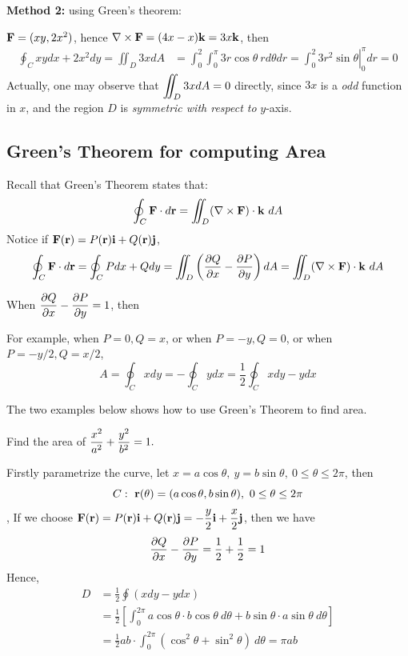 \begin{spacing}{1.3}
    \vspace{0.2in}
    {\bf Method 2: } using Green's theorem:

    ${\bf F}=(xy, 2x^2)$, hence $\nabla \times {\bf F}=(4x-x){\bf k} =3x{\bf k}$, then
    \begin{align*}
        \oint_{C} x y d x+2 x^{2} d y = \iint_D 3x dA &=\int_0^2\int_0^{\pi} 3r\cos\theta \ rd\theta dr 
            = \left. \int_0^2 3r^2\sin\theta \right|_0^{\pi} dr=0
    \end{align*}
    Actually, one may observe that $\displaystyle \iint_D 3x dA=0$ directly, since $3x$ is a {\it odd} function in 
    $x$, and the region $D$ is {\it symmetric with respect to }$y$-axis.



    \newpage
    \subsection{Green's Theorem for computing Area}

    Recall that Green's Theorem states that:
    $$\oint_C {\bf F}\cdot d{\bf r}=\iint_D (\nabla \times {\bf F})\cdot {\bf k}\ dA$$
    Notice if ${\bf F}({\bf r})=P({\bf r}){\bf i}+Q({\bf r}){\bf j}$,
    $$\oint_{C} \mathbf{F} \cdot d \mathbf{r}=\oint_{C} P d x+Q d y
    =\iint_{D}\left(\frac{\partial Q}{\partial x}-\frac{\partial P}{\partial y}\right) d A
    =\iint_D (\nabla \times {\bf F})\cdot {\bf k}\ dA$$

    When $\displaystyle \frac{\partial Q}{\partial x}-\frac{\partial P}{\partial y}=1$, then 
    \begin{center}
    \end{center}

    For example, when $P=0, Q=x$, or when $P=-y, Q=0$, or when $P=-y/2, Q=x/2$,
    $$A=\oint_C xdy=-\oint_C ydx=\frac{1}{2}\oint_C xdy-ydx$$



    \newpage
    {\blue The two examples below shows how to use Green's Theorem to find area.}

    \eg Find the area of $\displaystyle \frac{x^2}{a^2}+\frac{y^2}{b^2}=1.$

    \sol Firstly parametrize the curve, let $x=a\cos\theta,\ y=b\sin\theta,\ 0\le \theta\le 2\pi$, then 
    $$C:\ {\bf r}(\theta)=(a\cos\theta, b\sin\theta),\ 0\le \theta\le 2\pi$$,
    If we choose $\displaystyle {\bf F}({\bf r})=P({\bf r}){\bf i}+Q({\bf r}){\bf j}=-\frac{y}{2}{\bf i}+\frac{x}{2}{\bf j}$, then we have
    $$\frac{\partial Q}{\partial x}-\frac{\partial P}{\partial y}=\frac{1}{2}+\frac{1}{2}=1$$
    Hence, 
    \begin{align*}
        D &= \frac{1}{2} \oint (xdy-ydx)\\
        &= \frac{1}{2} \left[ \int_0^{2\pi} a\cos\theta\cdot b\cos\theta\ d\theta 
        + b\sin\theta\cdot a\sin\theta\ d\theta \right]\\
        &= \frac{1}{2} ab \cdot \int_0^{2\pi} (\cos^2\theta+\sin^2\theta)\ d\theta =\pi ab
    \end{align*}



\end{spacing}

